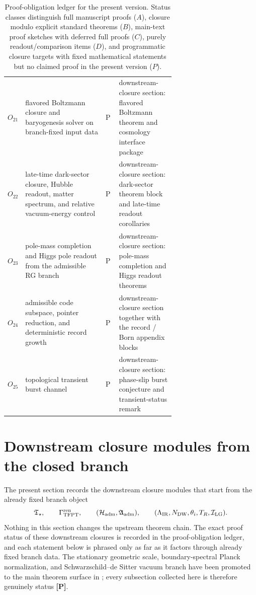 \begin{table}[p]
\begin{tabularx}{\linewidth}{@{}>{\raggedright\arraybackslash}p{0.10\linewidth}>{\raggedright\arraybackslash}p{0.48\linewidth}>{\centering\arraybackslash}p{0.08\linewidth}Y@{}}
$O_{21}$ & flavored Boltzmann closure and baryogenesis solver on branch-fixed input data & P & downstream-closure section: flavored Boltzmann theorem and cosmology interface package \\
$O_{22}$ & late-time dark-sector closure, Hubble readout, matter spectrum, and relative vacuum-energy control & P & downstream-closure section: dark-sector theorem block and late-time readout corollaries \\
$O_{23}$ & pole-mass completion and Higgs pole readout from the admissible RG branch & P & downstream-closure section: pole-mass completion and Higgs readout theorems \\
$O_{24}$ & admissible code subspace, pointer reduction, and deterministic record growth & P & downstream-closure section together with the record / Born appendix blocks \\
$O_{25}$ & topological transient burst channel & P & downstream-closure section: phase-slip burst conjecture and transient-status remark \\
\bottomrule
\end{tabularx}
\caption{Proof-obligation ledger for the present version. Status classes distinguish full manuscript proofs ($A$), closure modulo explicit standard theorems ($B$), main-text proof sketches with deferred full proofs ($C$), purely readout/comparison items ($D$), and programmatic closure targets with fixed mathematical statements but no claimed proof in the present version ($P$).}
\label{tab:proof-obligation-ledger}
\end{table}

\section{Downstream closure modules from the closed branch}
\label{sec:downstream_closure_modules}

The present section records the downstream closure modules that start from the already fixed branch
object
\[
\mathfrak T_{\star},
\qquad
\Gamma_{\mathrm{TFPT}}^{\mathrm{ren}},
\qquad
(\mathcal H_{\mathrm{adm}},\mathfrak A_{\mathrm{adm}}),
\qquad
(\Lambda_{\mathrm{IR}},N_{\mathrm{DW}},\theta_i,T_R,\mathcal I_{\mathrm{LG}}).
\]
Nothing in this section changes the upstream theorem chain. The exact proof status of these
downstream closures is recorded in the proof-obligation ledger, and each statement below is phrased
only as far as it factors through already fixed branch data. The stationary geometric scale,
boundary-spectral Planck normalization, and Schwarzschild--de Sitter vacuum branch have been
promoted to the main theorem surface in ; every
subsection collected here is therefore genuinely status \textbf{[P]}.

